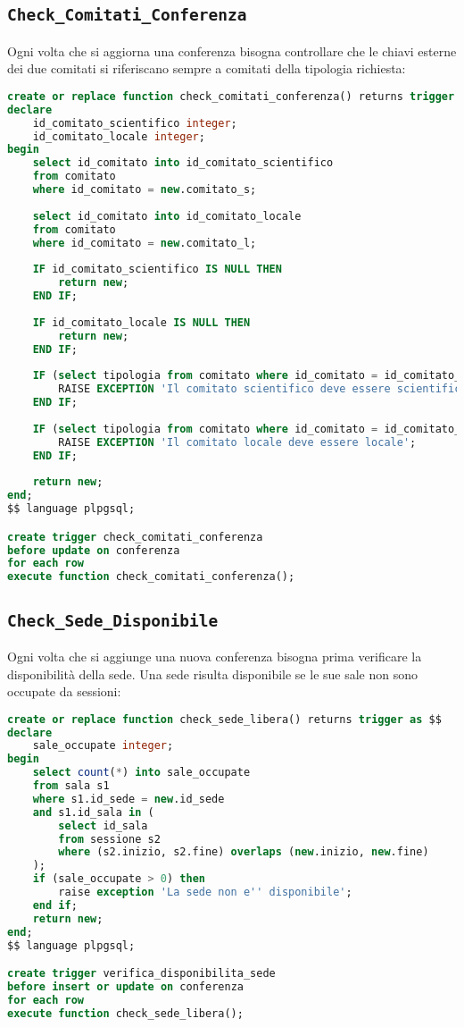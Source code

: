 \subsection{\texttt{Check\_Comitati\_Conferenza}}\label{trigger:check_comitati}
Ogni volta che si aggiorna una conferenza bisogna controllare che le chiavi esterne dei due comitati si riferiscano sempre a comitati della tipologia richiesta:
\begin{lstlisting}[language=SQL, caption={\texttt{check\_comitati\_conferenza}},style=mystyle]
create or replace function check_comitati_conferenza() returns trigger as $$
declare 
    id_comitato_scientifico integer;
    id_comitato_locale integer;
begin
    select id_comitato into id_comitato_scientifico
    from comitato
    where id_comitato = new.comitato_s;
    
    select id_comitato into id_comitato_locale
    from comitato
    where id_comitato = new.comitato_l;
    
    IF id_comitato_scientifico IS NULL THEN
        return new;
    END IF;
    
    IF id_comitato_locale IS NULL THEN
        return new;
    END IF;
    
    IF (select tipologia from comitato where id_comitato = id_comitato_scientifico) <> 'scientifico' THEN
        RAISE EXCEPTION 'Il comitato scientifico deve essere scientifico';
    END IF;
    
    IF (select tipologia from comitato where id_comitato = id_comitato_locale) <> 'locale' THEN
        RAISE EXCEPTION 'Il comitato locale deve essere locale';
    END IF;
    
    return new;
end;
$$ language plpgsql;

create trigger check_comitati_conferenza
before update on conferenza
for each row
execute function check_comitati_conferenza();
\end{lstlisting}
\subsection{\texttt{Check\_Sede\_Disponibile}}\label{trigger:check_sede_disponibile}
Ogni volta che si aggiunge una nuova conferenza bisogna prima verificare la disponibilità della sede. Una sede risulta disponibile se le sue sale non sono occupate da sessioni:
\begin{lstlisting}[caption={\texttt{Check\_sede\_libera}}, language=SQL, style=mystyle]
create or replace function check_sede_libera() returns trigger as $$
declare 
    sale_occupate integer;
begin
    select count(*) into sale_occupate
    from sala s1
    where s1.id_sede = new.id_sede
    and s1.id_sala in (
        select id_sala
        from sessione s2
        where (s2.inizio, s2.fine) overlaps (new.inizio, new.fine)
    );
    if (sale_occupate > 0) then
        raise exception 'La sede non e'' disponibile';
    end if;
    return new;
end;
$$ language plpgsql;

create trigger verifica_disponibilita_sede
before insert or update on conferenza
for each row
execute function check_sede_libera();
\end{lstlisting}
